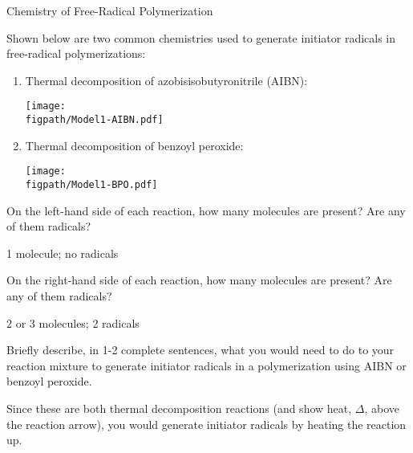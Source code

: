 \begin{activity}{Chemistry of Free-Radical Polymerization}
\begin{model}[Initiation]
	Shown below are two common chemistries used to generate initiator radicals in free-radical polymerizations:
	
	\begin{enumerate}
		\item Thermal decomposition of azobisisobutyronitrile (AIBN):
	
			\centerline{\texttt{[image: \\figpath/Model1-AIBN.pdf]}}
			
		\item Thermal decomposition of benzoyl peroxide:
	
			\centerline{\texttt{[image: \\figpath/Model1-BPO.pdf]}}
			
	\end{enumerate}
	
	
\end{model}


\begin{ctqs}

	\question On the left-hand side of each reaction, how many molecules are present?  Are any of them radicals?
	
		\begin{solution}[0.5in]{}
		
			1 molecule; no radicals
			
		\end{solution}
	
	\question On the right-hand side of each reaction, how many molecules are present? Are any of them radicals?
	
		\begin{solution}[0.5in]{}
		
			2 or 3 molecules; 2 radicals
			
		\end{solution}
	
	\question Briefly describe, in 1-2 complete sentences, what you would need to do to your reaction mixture to generate initiator radicals in a polymerization using AIBN or benzoyl peroxide.
	
		\begin{solution}[1.5in]{}
			Since these are both thermal decomposition reactions (and show heat, $\Delta$, above the reaction arrow), you would generate initiator radicals by heating the reaction up.
		\end{solution}
		

\end{ctqs}
\end{activity}
